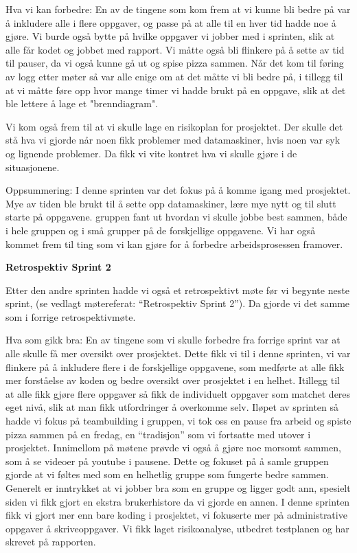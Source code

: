 \documentclass[12pt,a4paper,norsk]{article}
\begin{document}
Hva vi kan forbedre:
En av de tingene som kom frem at vi kunne bli bedre på var å inkludere alle i flere oppgaver, og passe på at alle til en hver tid hadde noe å gjøre. Vi burde også bytte på hvilke oppgaver vi jobber med i sprinten, slik at alle får kodet og jobbet med rapport.
Vi måtte også bli flinkere på å sette av tid til pauser, da vi også kunne gå ut og spise pizza sammen. 
Når det kom til føring av logg etter møter så var alle enige om at det måtte vi bli bedre på, i tillegg til at vi måtte føre opp hvor mange timer vi hadde brukt på en oppgave, slik at det ble lettere å lage et "brenndiagram".

Vi kom også frem til at vi skulle lage en risikoplan for prosjektet. Der skulle det stå hva vi gjorde når noen fikk problemer med datamaskiner, hvis noen var syk og lignende problemer. Da fikk vi vite kontret hva vi skulle gjøre i de situasjonene. 

Oppsummering:
I denne sprinten var det fokus på å komme igang med prosjektet. Mye av tiden ble brukt til å sette opp datamaskiner, lære mye nytt og til slutt starte på oppgavene. gruppen fant ut hvordan vi skulle jobbe best sammen, både i hele gruppen og i små grupper på de forskjellige oppgavene. Vi har også kommet frem til ting som vi kan gjøre for å forbedre arbeidsprosessen framover. 

\bigskip \noindent \textbf{Retrospektiv Sprint 2}
\par Etter den andre sprinten hadde vi også et retrospektivt møte før vi begynte neste sprint, (se vedlagt møtereferat: “Retrospektiv Sprint 2”). Da gjorde vi det samme som i forrige retrospektivmøte.

Hva som gikk bra:
En av tingene som vi skulle forbedre fra forrige sprint var at alle skulle få mer oversikt over prosjektet. Dette fikk vi til i denne sprinten, vi var flinkere på å inkludere flere i de forskjellige oppgavene, som medførte at alle fikk mer forståelse av koden og bedre oversikt over prosjektet i en helhet. Itillegg til at alle fikk gjøre flere oppgaver så fikk de individuelt oppgaver som matchet deres eget nivå, slik at man fikk utfordringer å overkomme selv.
Iløpet av sprinten så hadde vi fokus på teambuilding i gruppen, vi tok oss en pause fra arbeid og spiste pizza sammen på en fredag, en “tradisjon” som vi fortsatte med utover i prosjektet. Innimellom på møtene prøvde vi også å gjøre noe morsomt sammen, som å se videoer på youtube i pausene. Dette og fokuset på å samle gruppen gjorde at vi føltes med som en helhetlig gruppe som fungerte bedre sammen. 
Generelt er inntrykket at vi jobber bra som en gruppe og ligger godt ann, spesielt siden vi fikk gjort en ekstra brukerhistore da vi gjorde en annen. 
I denne sprinten fikk vi gjort mer enn bare koding i prosjektet, vi fokuserte mer på administrative oppgaver å skriveoppgaver. Vi fikk laget risikoanalyse, utbedret testplanen og har skrevet på rapporten. 
\end{document}
